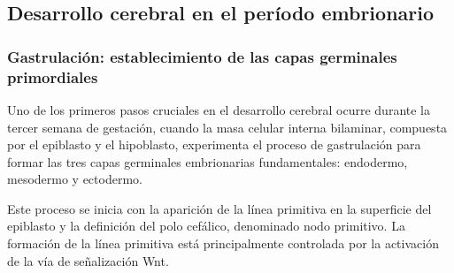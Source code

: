 \documentclass[11pt,letterpaper]{report}
\begin{document}
\begin{table}[htbp]
\caption{Siete fases del desarrollo cerebral}
\label{tab:fases-desarrollo-cerebral}
\end{table}

\subsection{Desarrollo cerebral en el período embrionario}
\subsubsection{Gastrulación: establecimiento de las capas germinales primordiales}
Uno de los primeros pasos cruciales en el desarrollo cerebral ocurre durante la
tercer semana de gestación, cuando la masa celular interna bilaminar, compuesta
por el epiblasto y el hipoblasto, experimenta el proceso de gastrulación para
formar las tres capas germinales embrionarias fundamentales: endodermo,
mesodermo y ectodermo. \cite{Polin124}

Este proceso se inicia con la aparición de la línea primitiva en la superficie
del epiblasto y la definición del polo cefálico, denominado nodo primitivo. La
formación de la línea primitiva está principalmente controlada por la
activación de la vía de señalización Wnt. \cite{MooreEmbryo4}
\end{document}
